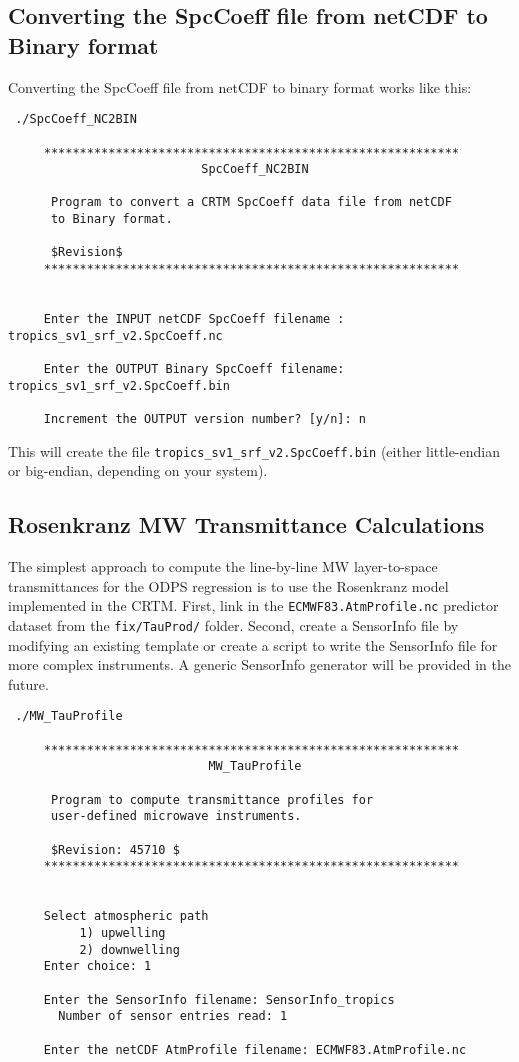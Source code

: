 \subsection{Converting the SpcCoeff file from netCDF to Binary format}
Converting the SpcCoeff file from netCDF to binary format works like this:
\begin{verbatim}
 ./SpcCoeff_NC2BIN 

     **********************************************************
                           SpcCoeff_NC2BIN

      Program to convert a CRTM SpcCoeff data file from netCDF 
      to Binary format.

      $Revision$
     **********************************************************


     Enter the INPUT netCDF SpcCoeff filename : tropics_sv1_srf_v2.SpcCoeff.nc

     Enter the OUTPUT Binary SpcCoeff filename: tropics_sv1_srf_v2.SpcCoeff.bin

     Increment the OUTPUT version number? [y/n]: n
\end{verbatim}
This will create the file \verb|tropics_sv1_srf_v2.SpcCoeff.bin| (either little-endian or big-endian, depending on your system).

\subsection{Rosenkranz MW Transmittance Calculations}
The simplest approach to compute the line-by-line MW layer-to-space transmittances for the ODPS regression is to use the Rosenkranz model implemented in the CRTM.
First, link in the \verb|ECMWF83.AtmProfile.nc| predictor dataset from the \verb|fix/TauProd/| folder.
Second, create a SensorInfo file by modifying an existing template or create a script to write the SensorInfo file for more complex instruments.
A generic SensorInfo generator will be provided in the future.

\begin{verbatim}
 ./MW_TauProfile 

     **********************************************************
                            MW_TauProfile

      Program to compute transmittance profiles for 
      user-defined microwave instruments.

      $Revision: 45710 $
     **********************************************************


     Select atmospheric path
          1) upwelling  
          2) downwelling
     Enter choice: 1

     Enter the SensorInfo filename: SensorInfo_tropics
       Number of sensor entries read: 1

     Enter the netCDF AtmProfile filename: ECMWF83.AtmProfile.nc
\end{verbatim}

